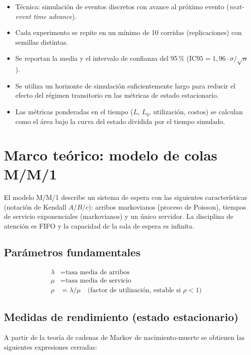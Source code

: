 \documentclass{article}
\begin{document}
\begin{itemize}
    \item Técnica: simulación de eventos discretos con avance al próximo
    evento (\textit{next-event time advance}).
    \item Cada experimento se repite en un mínimo de 10 corridas
    (replicaciones) con semillas distintas.
    \item Se reportan la media y el intervalo de confianza del 95\,\%
    ($\text{IC95} = 1{,}96\cdot\sigma/\sqrt{n}$).
    \item Se utiliza un horizonte de simulación suficientemente largo para
    reducir el efecto del régimen transitorio en las métricas de estado
    estacionario.
    \item Las métricas ponderadas en el tiempo ($L$, $L_q$, utilización,
    costos) se calculan como el área bajo la curva del estado dividida por
    el tiempo simulado.
\end{itemize}

\section{Marco teórico: modelo de colas M/M/1}

El modelo M/M/1 describe un sistema de espera con las siguientes
características (notación de Kendall $A/B/c$): arribos markovianos (proceso
de Poisson), tiempos de servicio exponenciales (markovianos) y un único
servidor. La disciplina de atención es FIFO y la capacidad de la sala de
espera es infinita.

\subsection{Parámetros fundamentales}

\begin{align}
    \lambda &= \text{tasa media de arribos} \\
    \mu &= \text{tasa media de servicio} \\
    \rho &= \lambda / \mu \quad \text{(factor de utilización, estable si } \rho < 1\text{)}
\end{align}

\subsection{Medidas de rendimiento (estado estacionario)}

A partir de la teoría de cadenas de Markov de nacimiento-muerte se obtienen
las siguientes expresiones cerradas:
\end{document}
